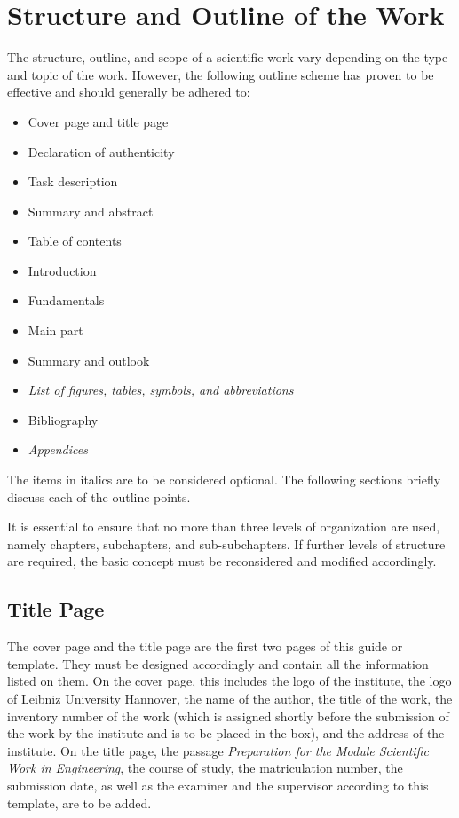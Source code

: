 \chapter{Structure and Outline of the Work}
\label{cha:Structure}

The structure, outline, and scope of a scientific work vary depending on the type and topic of the work. However, the following outline scheme has proven to be effective and should generally be adhered to:
%
\begin{itemize}
	\item Cover page and title page
	\item Declaration of authenticity
	\item Task description
	\item Summary and abstract
	\item Table of contents
	\item Introduction
	\item Fundamentals
	\item Main part
	\item Summary and outlook
	\item \textit{List of figures, tables, symbols, and abbreviations}
	\item Bibliography
	\item \textit{Appendices}
\end{itemize}
%
The items in italics are to be considered optional. The following sections briefly discuss each of the outline points.

It is essential to ensure that no more than three levels of organization are used, namely chapters, subchapters, and sub-subchapters. If further levels of structure are required, the basic concept must be reconsidered and modified accordingly.

\section{Title Page}
\label{sec:TitlePage}


The cover page and the title page are the first two pages of this guide or template. They must be designed accordingly and contain all the information listed on them. On the cover page, this includes the logo of the institute, the logo of Leibniz University Hannover, the name of the author, the title of the work, the inventory number of the work (which is assigned shortly before the submission of the work by the institute and is to be placed in the box), and the address of the institute. On the title page, the passage \textit{Preparation for the Module Scientific Work in Engineering}, the course of study, the matriculation number, the submission date, as well as the examiner and the supervisor according to this template, are to be added.

